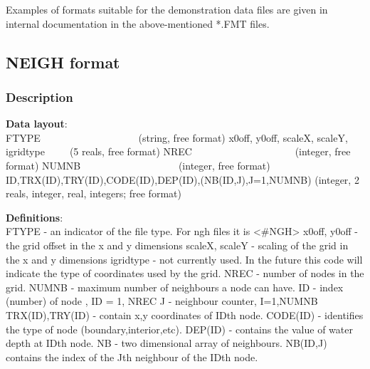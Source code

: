 \documentclass{article}
\begin{document}
Examples of formats suitable for the demonstration data files are given in internal documentation in the above-mentioned *.FMT files.

\subsection[NEIGH format]{NEIGH format}
\subsubsection[Description]{Description}

\textbf{Data layout}: \\ 

\noindent
FTYPE \ \ \ \ \ \ \ \ \ \ \ \ \ \ \ \ \ \ \ (string, free format) \newline
x0off, y0off, scaleX, scaleY, igridtype\ \ \ \ \ (5 reals, free format)\newline
NREC \ \ \ \ \ \ \ \ \ \ \ \ \ \ \ \ \ \ \ \ (integer, free format)\newline
NUMNB \ \ \ \ \ \ \ \ \ \ \ \ \ \ \ \ \ \ \ (integer, free format)\newline
ID,TRX(ID),TRY(ID),CODE(ID),DEP(ID),(NB(ID,J),J=1,NUMNB)\newline
(integer, 2 reals, integer, real, integers; free format) \newline

\noindent\textbf{Definitions}:\\ 

\noindent
FTYPE - an indicator of the file type.  For ngh files it is <\#NGH> \newline
x0off, y0off - the grid offset in the x and y dimensions \newline
scaleX, scaleY - scaling of the grid in the x and y dimensions \newline
igridtype - not currently used.  In the future this code will indicate the type of coordinates used by the grid. \newline
NREC - number of nodes in the grid.\newline
NUMNB - maximum number of neighbours a node can have.\newline
ID - index (number) of node , ID = 1, NREC\newline
J  - neighbour counter, I=1,NUMNB\newline
TRX(ID),TRY(ID) - contain x,y coordinates of IDth node.\newline
CODE(ID) - identifies the type of node (boundary,interior,etc).\newline
DEP(ID) - contains the value of water depth at IDth node.\newline
NB - two dimensional array of neighbours.\newline
NB(ID,J) contains the index of the Jth neighbour of the IDth node.
\end{document}

